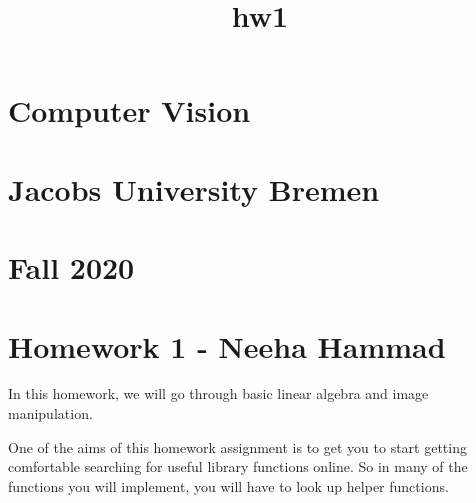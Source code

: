 \documentclass[11pt]{article}
\title{hw1}
\begin{document}
    
    
    \maketitle
    
    

    
    \section{Computer Vision}\label{computer-vision}

\section{Jacobs University Bremen}\label{jacobs-university-bremen}

\section{Fall 2020}\label{fall-2020}

\section{Homework 1 - Neeha Hammad}\label{homework-1---neeha-hammad}

In this homework, we will go through basic linear algebra and image
manipulation.

One of the aims of this homework assignment is to get you to start
getting comfortable searching for useful library functions online. So in
many of the functions you will implement, you will have to look up
helper functions.
\end{document}
